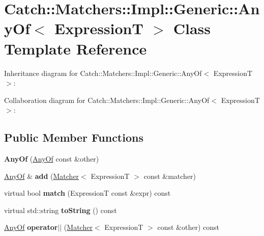 \hypertarget{classCatch_1_1Matchers_1_1Impl_1_1Generic_1_1AnyOf}{}\section{Catch\+:\+:Matchers\+:\+:Impl\+:\+:Generic\+:\+:Any\+Of$<$ ExpressionT $>$ Class Template Reference}
\label{classCatch_1_1Matchers_1_1Impl_1_1Generic_1_1AnyOf}


Inheritance diagram for Catch\+:\+:Matchers\+:\+:Impl\+:\+:Generic\+:\+:Any\+Of$<$ ExpressionT $>$\+:


Collaboration diagram for Catch\+:\+:Matchers\+:\+:Impl\+:\+:Generic\+:\+:Any\+Of$<$ ExpressionT $>$\+:
\subsection*{Public Member Functions}
\begin{DoxyCompactItemize}
\item 
{\bfseries Any\+Of} (\hyperlink{classCatch_1_1Matchers_1_1Impl_1_1Generic_1_1AnyOf}{Any\+Of} const \&other)\hypertarget{classCatch_1_1Matchers_1_1Impl_1_1Generic_1_1AnyOf_a74fbc05b32d334fcbfd0fae0163a404e}{}\label{classCatch_1_1Matchers_1_1Impl_1_1Generic_1_1AnyOf_a74fbc05b32d334fcbfd0fae0163a404e}

\item 
\hyperlink{classCatch_1_1Matchers_1_1Impl_1_1Generic_1_1AnyOf}{Any\+Of} \& {\bfseries add} (\hyperlink{structCatch_1_1Matchers_1_1Impl_1_1Matcher}{Matcher}$<$ ExpressionT $>$ const \&matcher)\hypertarget{classCatch_1_1Matchers_1_1Impl_1_1Generic_1_1AnyOf_a3bce94b627551e5f96c5f9c6060413f0}{}\label{classCatch_1_1Matchers_1_1Impl_1_1Generic_1_1AnyOf_a3bce94b627551e5f96c5f9c6060413f0}

\item 
virtual bool {\bfseries match} (ExpressionT const \&expr) const \hypertarget{classCatch_1_1Matchers_1_1Impl_1_1Generic_1_1AnyOf_a2f97a08338e12deba541043a57d73db9}{}\label{classCatch_1_1Matchers_1_1Impl_1_1Generic_1_1AnyOf_a2f97a08338e12deba541043a57d73db9}

\item 
virtual std\+::string {\bfseries to\+String} () const \hypertarget{classCatch_1_1Matchers_1_1Impl_1_1Generic_1_1AnyOf_a7ecc6ec08b2018a643923a9d450aa328}{}\label{classCatch_1_1Matchers_1_1Impl_1_1Generic_1_1AnyOf_a7ecc6ec08b2018a643923a9d450aa328}

\item 
\hyperlink{classCatch_1_1Matchers_1_1Impl_1_1Generic_1_1AnyOf}{Any\+Of} {\bfseries operator$\vert$$\vert$} (\hyperlink{structCatch_1_1Matchers_1_1Impl_1_1Matcher}{Matcher}$<$ ExpressionT $>$ const \&other) const \hypertarget{classCatch_1_1Matchers_1_1Impl_1_1Generic_1_1AnyOf_a07f4ea2ae366a6521a5d7bff4522e8bf}{}\label{classCatch_1_1Matchers_1_1Impl_1_1Generic_1_1AnyOf_a07f4ea2ae366a6521a5d7bff4522e8bf}

\end{DoxyCompactItemize}
